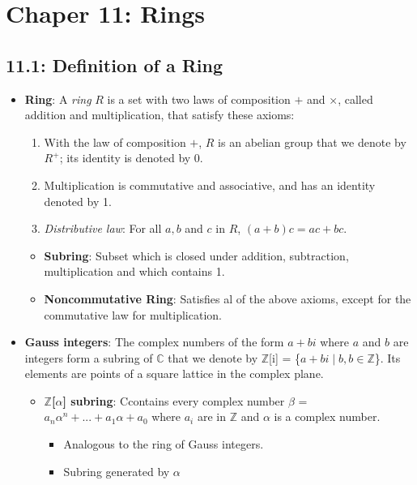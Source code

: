 \documentclass[12pt]{article}
\begin{document}
\section*{Chaper 11: Rings}

\subsection*{11.1: Definition of a Ring}
\begin{itemize}
  \item \textbf{Ring}: A \textit{ring} $R$ is a set with two laws of composition $+$ and $\times$, called addition and multiplication, that satisfy these axioms:
  \begin{enumerate}
    \begin{enumerate}
      \item With the law of composition $+$, $R$ is an abelian group that we denote by $R^+$; its identity is denoted by 0.
      \item Multiplication is commutative and associative, and has an identity denoted by 1.
      \item \textit{Distributive law}: For all $a, b$ and $c$ in $R$, $(a + b)c = ac + bc$.
    \end{enumerate}
  \end{enumerate}
  \begin{itemize}
    \item \textbf{Subring}: Subset which is closed under addition, subtraction, multiplication and which contains 1.
    \item \textbf{Noncommutative Ring}: Satisfies al of the above axioms, except for the commutative law for multiplication.
  \end{itemize}
  \item \textbf{Gauss integers}: The complex numbers of the form $a + bi$ where $a$ and $b$ are integers form a subring of $\mathbb{C}$ that we denote by $\mathbb{Z}$[i] = \{$a + bi \mid b, b \in \mathbb{Z}$\}. Its elements are points of a square lattice in the complex plane.
  \begin{itemize}
    \item \textbf{$\mathbb{Z}$[$\alpha$] subring}: Ccontains every complex number $\beta$ = $a_n\alpha^n + ... + a_1\alpha + a_0$ where $a_i$ are in $\mathbb{Z}$ and $\alpha$ is a complex number.
    \begin{itemize}
      \item Analogous to the ring of Gauss integers.
      \item Subring generated by $\alpha$

\end{itemize}
\end{itemize}
\end{itemize}
\end{document}
